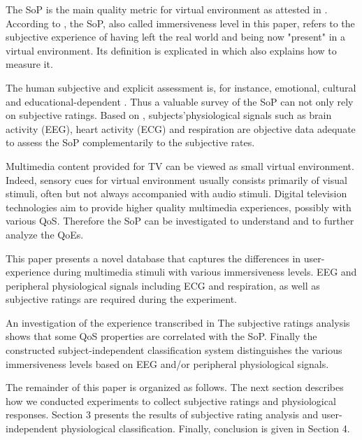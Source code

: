 The \ac{SoP} is the main quality metric for virtual environment as attested in \cite{sw97,Dinh:1999:EIM:554230.835733}.
According to \cite{SS}, the \ac{SoP}, also called immersiveness level in this paper, refers to the subjective experience of having left the real world and being now "present" in a virtual environment.
Its definition is explicated in \cite{Witmer:1998:MPV:1246761.1246762,6790390} which also explains how to measure it.

The human subjective and explicit assessment is, for instance, emotional, cultural and educational-dependent \cite{forgas1999feeling,geng2010cultural,5252120,1979}. Thus a valuable survey of the \ac{SoP} can not only rely on subjective ratings. Based on \cite{5871728,2Dvs3D,6095505}, subjects'physiological signals such as brain activity (\ac{EEG}), heart activity (\ac{ECG}) and respiration are objective data adequate to assess the \ac{SoP} complementarily to the subjective rates.

Multimedia content provided for TV can be viewed as small virtual environment. Indeed, sensory cues for virtual environment usually consists primarily of visual stimuli, often but not always accompanied with audio stimuli. 
Digital television technologies aim to provide higher quality multimedia experiences, possibly with various \ac{QoS}. Therefore the \ac{SoP} can be investigated to understand and to further analyze the \acp{QoE}.

This paper presents a novel database that captures the differences in user-experience during multimedia stimuli with various immersiveness levels. \ac{EEG} and peripheral physiological signals including \ac{ECG} and respiration, as well as subjective ratings are required during the experiment.

An investigation of the experience transcribed in The subjective ratings analysis shows that some \ac{QoS} properties are correlated with the \ac{SoP}. Finally the constructed subject-independent classification system distinguishes the various immersiveness levels based on \ac{EEG} and/or peripheral physiological signals.

The remainder of this paper is organized as follows.
The next section describes how we conducted experiments to collect subjective ratings and physiological responses. Section 3 presents the results of subjective rating analysis and user-independent physiological classification. Finally, conclusion is given in Section 4.


